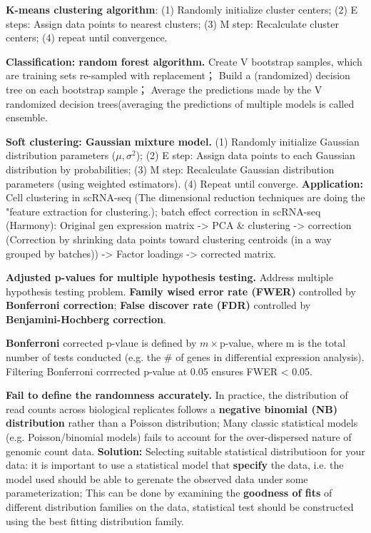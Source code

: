 \vspace{0.1em}\noindent
\textbf{K-means clustering algorithm}: (1) Randomly initialize cluster centers; (2) E steps: Assign data points to nearest clusters; (3) M step: Recalculate cluster centers; (4) repeat until convergence.

\vspace{0.1em}\noindent
\textbf{Classification: random forest algorithm.} Create V bootstrap samples, which are training sets re-sampled with replacement； Build a (randomized) decision tree on each bootstrap sample； Average the predictions made by the V randomized decision trees(averaging the predictions of multiple models is called ensemble.

\vspace{0.1em}\noindent
\textbf{Soft clustering: Gaussian mixture model.} (1) Randomly initialize Gaussian distribution parameters ($\mu, \sigma^2$); (2) E step: Assign data points to each Gaussian distribution by probabilities; (3) M step: Recalculate Gaussian distribution parameters (using weighted estimators). (4) Repeat until converge. \textbf{Application:} Cell clustering in scRNA-seq (The dimensional reduction techniques are doing the "feature extraction for clustering.); batch effect correction in scRNA-seq (Harmony): Original gen expression matrix -> PCA \& clustering -> correction (Correction by shrinking data points toward clustering centroids (in a way grouped by batches)) -> Factor loadings -> corrected matrix.

\vspace{0.1em}\noindent
\textbf{Adjusted p-values for multiple hypothesis testing.} Address multiple hypothesis testing problem. \textbf{Family wised error rate (FWER)} controlled by \textbf{Bonferroni correction}; \textbf{False discover rate (FDR)} controlled by \textbf{Benjamini-Hochberg correction}.

\vspace{0.1em}\noindent
\textbf{Bonferroni} corrected p-vlaue is defined by $m\times$p-value, where m is the total number of tests conducted (e.g. the \# of genes in differential expression analysis). Filtering Bonferroni corrrected p-value at 0.05 ensures FWER < 0.05.

\vspace{0.1em}\noindent
\textbf{Fail to define the randomness accurately.} In practice, the distribution of read counts across biological replicates follows a \textbf{negative binomial (NB) distribution} rather than a Poisson distribution; Many classic statistical models (e.g. Poisson/binomial models) fails to account for the over-dispersed nature of genomic count data. \textbf{Solution:} Selecting suitable statistical distributioon for your data: it is important to use a statistical model that \textbf{specify} the data, i.e. the model used should be able to gerenate the observed data under some parameterization; This can be done by examining the \textbf{goodness of fits} of different distribution families on the data, statistical test should be constructed using the best fitting distribution family.

